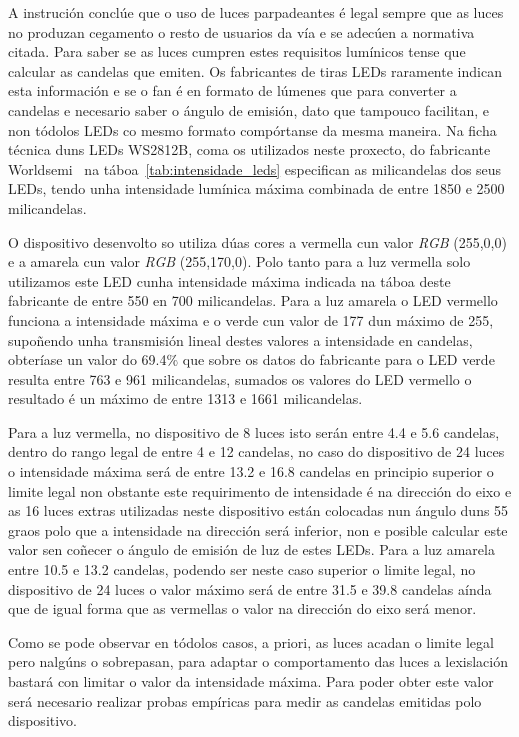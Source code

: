 A instrución conclúe que o uso de luces parpadeantes é legal sempre que as luces no produzan cegamento o resto de usuarios da vía e se adecúen a normativa citada.
Para saber se as luces cumpren estes requisitos lumínicos tense que calcular as candelas que emiten. Os fabricantes de tiras LEDs raramente indican esta información e se o fan é en formato de lúmenes que para converter a candelas e necesario saber o ángulo de emisión, dato que tampouco facilitan, e non tódolos LEDs co mesmo formato compórtanse da mesma maneira. Na ficha técnica duns LEDs WS2812B, coma os utilizados neste proxecto, do fabricante Worldsemi~\cite{WS2812BDatasheet} na táboa~\ref{tab:intensidade_leds} especifican as milicandelas dos seus LEDs, tendo unha intensidade lumínica máxima combinada de entre 1850 e 2500 milicandelas.

O dispositivo desenvolto so utiliza dúas cores a vermella cun valor \emph{RGB} (255,0,0) e a amarela cun valor \emph{RGB}  (255,170,0). Polo tanto para a luz vermella solo utilizamos este LED cunha intensidade máxima indicada na táboa deste fabricante de entre 550 en 700 milicandelas. Para a luz amarela o LED vermello funciona a intensidade máxima e o verde cun valor de 177 dun máximo de 255, supoñendo unha transmisión lineal destes valores a intensidade en candelas, obteríase un valor do 69.4\(\%\) que sobre os datos do fabricante para o LED verde resulta entre 763 e 961 milicandelas, sumados os valores do LED vermello o resultado é un máximo de entre 1313 e 1661 milicandelas.

Para a luz vermella, no dispositivo de 8 luces isto serán entre 4.4 e 5.6 candelas, dentro do rango legal de entre 4 e 12 candelas, no caso do dispositivo de 24 luces o intensidade máxima será de entre 13.2 e 16.8 candelas en principio superior o limite legal non obstante este requirimento de intensidade é na dirección do eixo e as 16 luces extras utilizadas neste dispositivo están colocadas nun ángulo duns 55 graos polo que a intensidade na dirección será inferior, non e posible calcular este valor sen coñecer o ángulo de emisión de luz de estes LEDs.
Para a luz amarela entre 10.5 e 13.2 candelas, podendo ser neste caso superior o limite legal, no dispositivo de 24 luces o valor máximo será de entre 31.5 e 39.8 candelas aínda que de igual forma que as vermellas o valor na dirección do eixo será menor.

Como se pode observar en tódolos casos, a priori, as luces acadan o limite legal pero nalgúns o sobrepasan, para adaptar o comportamento das luces a lexislación bastará con limitar o valor da intensidade máxima. Para poder obter este valor será necesario realizar probas empíricas para medir as candelas emitidas polo dispositivo.

